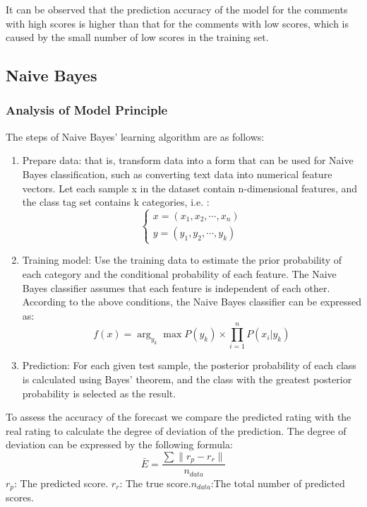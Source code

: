 \documentclass[12pt]{mcmthesis}
\begin{document}
It can be observed that the prediction accuracy of the model for the comments with high scores is higher than that for the comments with low scores, which is caused by the small number of low scores in the training set.
\subsection{Naive Bayes}
\subsubsection{Analysis of Model Principle}
The steps of Naive Bayes' learning algorithm are as follows: 
\begin{enumerate}
	\item Prepare data: that is, transform data into a form that can be used for Naive Bayes classification, such as converting text data into numerical feature vectors. Let each sample x in the dataset contain n-dimensional features, and the class tag set contains k categories, i.e. :
	\begin{equation}
		\begin{cases}
			x=(x_1,x_2,\cdots,x_n)\\
			y=(y_1,y_2,\cdots,y_k)
		\end{cases}
	\end{equation}
	\item Training model: Use the training data to estimate the prior probability of each category and the conditional probability of each feature. The Naive Bayes classifier assumes that each feature is independent of each other. According to the above conditions, the Naive Bayes classifier can be expressed as:
	\begin{equation}
		f(x)=\arg_{y_k}\max P(y_k)\times\prod_{i=1}^{n}P(x_i|y_k)
	\end{equation}
	\item Prediction: For each given test sample, the posterior probability of each class is calculated using Bayes' theorem, and the class with the greatest posterior probability is selected as the result.\cite{6}
\end{enumerate}
To assess the accuracy of the forecast we compare the predicted rating with the real rating to calculate the degree of deviation of the prediction. The degree of deviation can be expressed by the following formula:
\begin{equation}
	\bar{E}=\frac{\sum \parallel r_p-r_r\parallel}{n_{data}}
\end{equation}
$r_p$: The predicted score. $r_r$: The true score.$n_{data}$:The total number of predicted scores. 
\end{document}
